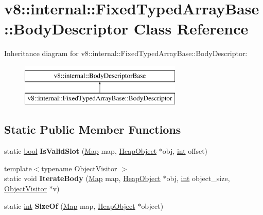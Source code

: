 \hypertarget{classv8_1_1internal_1_1FixedTypedArrayBase_1_1BodyDescriptor}{}\section{v8\+:\+:internal\+:\+:Fixed\+Typed\+Array\+Base\+:\+:Body\+Descriptor Class Reference}
\label{classv8_1_1internal_1_1FixedTypedArrayBase_1_1BodyDescriptor}
Inheritance diagram for v8\+:\+:internal\+:\+:Fixed\+Typed\+Array\+Base\+:\+:Body\+Descriptor\+:\begin{figure}[H]
\begin{center}
\leavevmode
\includegraphics[height=2.000000cm]{classv8_1_1internal_1_1FixedTypedArrayBase_1_1BodyDescriptor}
\end{center}
\end{figure}
\subsection*{Static Public Member Functions}
\begin{DoxyCompactItemize}
\item 
\mbox{\label{classv8_1_1internal_1_1FixedTypedArrayBase_1_1BodyDescriptor_af7df29fc92d5ab66d5210956f44069a8}} 
static \mbox{\hyperlink{classbool}{bool}} {\bfseries Is\+Valid\+Slot} (\mbox{\hyperlink{classv8_1_1internal_1_1Map}{Map}} map, \mbox{\hyperlink{classv8_1_1internal_1_1HeapObject}{Heap\+Object}} $\ast$obj, \mbox{\hyperlink{classint}{int}} offset)
\item 
\mbox{\label{classv8_1_1internal_1_1FixedTypedArrayBase_1_1BodyDescriptor_ad014d125fe7b1d39a5e15432115b046d}} 
{\footnotesize template$<$typename Object\+Visitor $>$ }\\static void {\bfseries Iterate\+Body} (\mbox{\hyperlink{classv8_1_1internal_1_1Map}{Map}} map, \mbox{\hyperlink{classv8_1_1internal_1_1HeapObject}{Heap\+Object}} $\ast$obj, \mbox{\hyperlink{classint}{int}} object\+\_\+size, \mbox{\hyperlink{classv8_1_1internal_1_1ObjectVisitor}{Object\+Visitor}} $\ast$v)
\item 
\mbox{\label{classv8_1_1internal_1_1FixedTypedArrayBase_1_1BodyDescriptor_ad48619b7ffb6769e286507eadf4cd366}} 
static \mbox{\hyperlink{classint}{int}} {\bfseries Size\+Of} (\mbox{\hyperlink{classv8_1_1internal_1_1Map}{Map}} map, \mbox{\hyperlink{classv8_1_1internal_1_1HeapObject}{Heap\+Object}} $\ast$object)
\end{DoxyCompactItemize}
